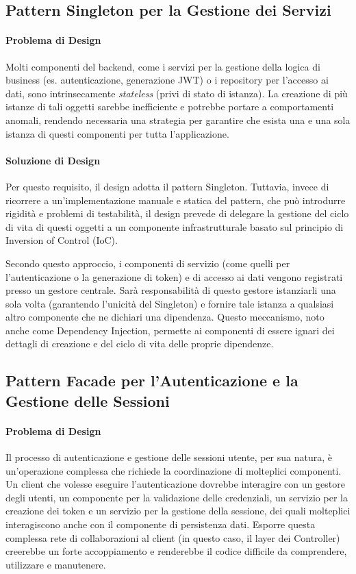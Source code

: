 \documentclass[12pt,a4paper,openright,twoside]{book}
\begin{document}
\subsection{Pattern Singleton per la Gestione dei Servizi}
\label{subsec:design_singleton}

\paragraph{Problema di Design}
Molti componenti del backend, come i servizi per la gestione della logica di business (es. autenticazione, generazione JWT) o i repository per l'accesso ai dati, sono intrinsecamente \textit{stateless} (privi di stato di istanza). La creazione di più istanze di tali oggetti sarebbe inefficiente e potrebbe portare a comportamenti anomali, rendendo necessaria una strategia per garantire che esista una e una sola istanza di questi componenti per tutta l'applicazione.

\paragraph{Soluzione di Design}
Per questo requisito, il design adotta il pattern Singleton. Tuttavia, invece di ricorrere a un'implementazione manuale e statica del pattern, che può introdurre rigidità e problemi di testabilità, il design prevede di delegare la gestione del ciclo di vita di questi oggetti a un componente infrastrutturale basato sul principio di Inversion of Control (IoC).

Secondo questo approccio, i componenti di servizio (come quelli per l'autenticazione o la generazione di token) e di accesso ai dati vengono registrati presso un gestore centrale. Sarà responsabilità di questo gestore istanziarli una sola volta (garantendo l'unicità del Singleton) e fornire tale istanza a qualsiasi altro componente che ne dichiari una dipendenza. Questo meccanismo, noto anche come Dependency Injection, permette ai componenti di essere ignari dei dettagli di creazione e del ciclo di vita delle proprie dipendenze.

\subsection{Pattern Facade per l'Autenticazione e la Gestione delle Sessioni}
\label{subsec:design_facade}

\paragraph{Problema di Design}
Il processo di autenticazione e gestione delle sessioni utente, per sua natura, è un'operazione complessa che richiede la coordinazione di molteplici componenti. Un client che volesse eseguire l'autenticazione dovrebbe interagire con un gestore degli utenti, un componente per la validazione delle credenziali, un servizio per la creazione dei token e un servizio per la gestione della sessione, dei quali molteplici interagiscono anche con il componente di persistenza dati. Esporre questa complessa rete di collaborazioni al client (in questo caso, il layer dei Controller) creerebbe un forte accoppiamento e renderebbe il codice difficile da comprendere, utilizzare e manutenere.
\end{document}
